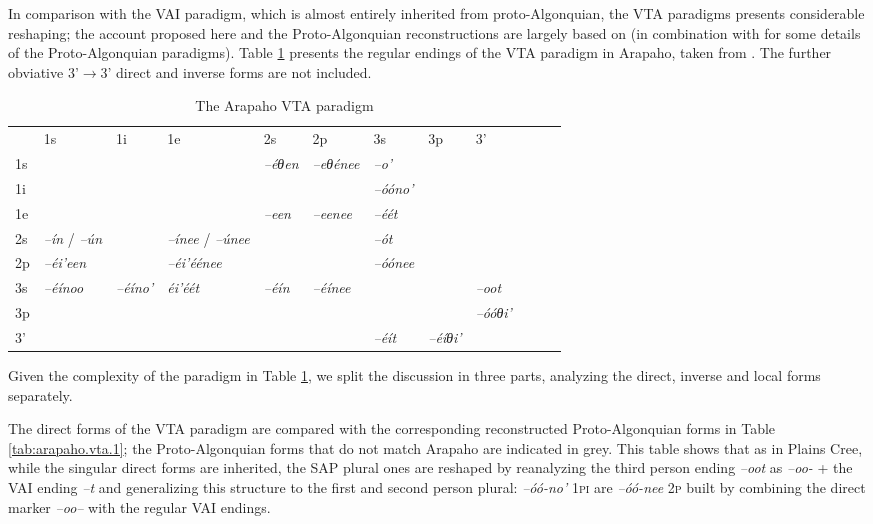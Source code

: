 \documentclass[twoside,a4paper,11pt]{article}
\newcommand{\ipa}[1]{{\phon\textit{#1}}}
\newcommand{\grise}[1]{\cellcolor{lightgray}\textbf{#1}}
\newcommand{\Σ}{\greek{Σ}}
\begin{document}
In comparison with the VAI paradigm, which is almost entirely inherited from proto-Algonquian, the VTA paradigms presents considerable reshaping; the account proposed here and the Proto-Algonquian reconstructions are largely based on  \citet[19-24]{goddard65arapaho} (in combination with  \citealt{goddard00cheyenne} for some details of the Proto-Algonquian paradigms). Table \ref{tab:arapaho.vta}   presents the regular endings of the VTA paradigm in Arapaho, taken from  \citet[487-490]{cowell06arapaho}. The  further obviative 3'$\rightarrow$3' direct and inverse forms are not included.

\begin{table}[H]
\caption{The Arapaho VTA paradigm}
\centering \label{tab:arapaho.vta}
\begin{tabular}{llllllllllll}
\toprule
 & 	1s & 	1i & 	1e & 	2s & 	2p & 	3s & 	3p & 	3' & 	\\
1s & \grise{} & 	\grise{} & 	\grise{} & 	\ipa{--éθen} & 	\ipa{--eθénee} & 	\ipa{--o'} & 	 & 	 & 	\\
1i & 	\grise{} & 	\grise{} & 	\grise{} & 	\grise{} & 	\grise{} & 	\ipa{--óóno'} & 	 & 	 & 	\\
1e & 	\grise{} & 	\grise{} & 	\grise{} & 	\ipa{--een} & 	\ipa{--eenee} & 	\ipa{--éét} & 	 & 	 & 	\\
2s & 	\ipa{--ín} / \ipa{--ún}& 	\grise{} & \ipa{--ínee} /	\ipa{--únee} & 	\grise{} & 	\grise{} & 	\ipa{--ót} & 	 & 	 & 	\\
2p & 	\ipa{--éi'een} & 	\grise{} & 	\ipa{--éi'éénee} & 	\grise{} & 	\grise{} & 	\ipa{--óónee} & 	 & 	 & 	\\
3s & 	\ipa{--éínoo} & 	\ipa{--éíno'} & 	\ipa{éi'éét} & 	\ipa{--éín} & 	\ipa{--éínee} & 	\grise{} & 	\grise{} & 	\ipa{--oot} & 	\\
3p & 	 & 	 & 	 & 	 & 	 & 	\grise{} & 	\grise{} & 	\ipa{--óóθi'} & 	\\
3' & 	 & 	 & 	 & 	 & 	 & 	\ipa{--éít} & 	\ipa{--éíθi'} &   & 	\\
\bottomrule
\end{tabular}
\end{table}

Given the complexity of the paradigm in 	Table \ref{tab:arapaho.vta}, we split the discussion  in three parts, analyzing the direct, inverse and local forms separately.

The direct forms of the VTA paradigm are compared with the corresponding reconstructed Proto-Algonquian forms in Table \ref{tab:arapaho.vta.1}; the Proto-Algonquian forms that do not match Arapaho are indicated in grey. This table shows that as in Plains Cree, while the singular direct forms are inherited, the SAP plural ones are reshaped by reanalyzing the third person ending \ipa{--oot} as \ipa{--oo-} + the VAI ending \ipa{--t} and generalizing this structure to the first and second person plural: \ipa{--óó-no'} \textsc{1pi} are \ipa{--óó-nee} \textsc{2p} built by combining the direct marker \ipa{--oo--} with the regular VAI endings.
\end{document}
